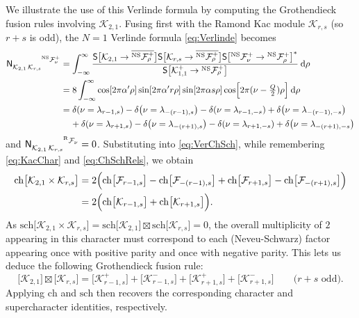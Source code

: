 \documentclass[a4paper,reqno,12pt]{report}
\theoremstyle{definition}
\numberwithin{equation}{section}
\let\originalleft\left     %
\let\originalright\right
\renewcommand{\left}{\mathopen{}\mathclose\bgroup\originalleft}
\renewcommand{\right}{\aftergroup\egroup\originalright}
\newcommand{\func}[2]{#1 \left( #2 \right)} %
\newcommand{\sqbrac}[1]{\left[ #1 \right]}
\newcommand{\dd}{\mathrm{d}}   %
\newcommand{\ra}{\rightarrow}
\newcommand{\Kac}[1]{\mathcal{K}_{#1}}       %
\newcommand{\Fock}[1]{\mathcal{F}_{#1}}      %
\newcommand{\chmap}{\mathrm{ch}}
\newcommand{\schmap}{\mathrm{sch}}
\newcommand{\Gr}[1]{\bigl[ #1 \bigr]}            %
\newcommand{\ch}[1]{\chmap \Gr{#1}}              %
\newcommand{\sch}[1]{\schmap \Gr{#1}}              %
\newcommand{\modS}{\mathsf{S}} %
\newcommand{\Smat}[2]{\modS \bigl[ #1 \ra #2 \bigr]}  %
\newcommand{\fuse}{\mathbin{\times}}                                            %
\newcommand{\Grfuse}{\mathbin{\boxtimes}}                                       %
\newcommand{\fuscoeff}[3]{\mathsf{N}_{#1 \, #2}^{\hphantom{#1 \, #2} #3}}       %
\newcommand{\ns}{Neveu-Schwarz}
\theoremstyle{plain}
\newcommand{\NSFock}[1]{{}^{\text{NS}}\Fock{#1}}   %
\newcommand{\RFock}[1]{{}^{\text{R}}\Fock{#1}}     %
\begin{document}
We illustrate the use of this Verlinde formula by computing the Grothendieck fusion rules involving $\Kac{2,1}$.  Fusing first with the Ramond Kac module $\Kac{r,s}$ (so $r+s$ is odd), the $N=1$ Verlinde formula \eqref{eq:Verlinde} becomes
\begin{align}
\fuscoeff{\Kac{2,1}}{\Kac{r,s}}{\NSFock{\nu}^+} &= \int_{-\infty}^{\infty} \frac{\Smat{\Kac{2,1}}{\overline{\NSFock{\rho}^+}} \Smat{\Kac{r,s}}{\overline{\NSFock{\rho}^+}} \Smat{\NSFock{\nu}^+}{\NSFock{\rho}^+}^*}{\Smat{\Kac{1,1}^+}{\NSFock{\rho}^+}} \: \dd \rho \notag \\
&= 8 \int_{-\infty}^{\infty} \cos \sqbrac{2 \pi \alpha' \rho} \sin \sqbrac{2 \pi \alpha' r \rho} \sin \sqbrac{2 \pi \alpha s \rho} \cos \sqbrac{2 \pi (\nu - \tfrac{Q}{2}) \rho} \: \dd \rho \notag \\
&= \func{\delta}{\nu = \lambda_{r-1,s}} - \func{\delta}{\nu = \lambda_{-(r-1),s}} - \func{\delta}{\nu = \lambda_{r-1,-s}} + \func{\delta}{\nu = \lambda_{-(r-1),-s}} \notag \\
&\mspace{20mu} + \func{\delta}{\nu = \lambda_{r+1,s}} - \func{\delta}{\nu = \lambda_{-(r+1),s}} - \func{\delta}{\nu = \lambda_{r+1,-s}} + \func{\delta}{\nu = \lambda_{-(r+1),-s}}
\end{align}
and $\fuscoeff{\Kac{2,1}}{\Kac{r,s}}{\RFock{\nu}} = 0$.  Substituting into \eqref{eq:VerChSch}, while remembering \eqref{eq:KacChar} and \eqref{eq:ChSchRels}, we obtain
\begin{align}
\ch{\Kac{2,1} \fuse \Kac{r,s}} &= 2 \Bigl( \ch{\Fock{r-1,s}} - \ch{\Fock{-(r-1),s}} + \ch{\Fock{r+1,s}} - \ch{\Fock{-(r+1),s}} \Bigr) \notag \\
&= 2 \Bigl( \ch{\Kac{r-1,s}} + \ch{\Kac{r+1,s}} \Bigr).
\end{align}
As $\sch{\Kac{2,1} \fuse \Kac{r,s}} = \sch{\Kac{2,1}} \Grfuse \sch{\Kac{r,s}} = 0$, the overall multiplicity of $2$ appearing in this character must correspond to each (\ns{}) factor appearing once with positive parity and once with negative parity.  This lets us deduce the following Grothendieck fusion rule:
\begin{equation} \label{GrFR:K21xKrsR}
\Gr{\Kac{2,1}} \Grfuse \Gr{\Kac{r,s}} = \Gr{\Kac{r-1,s}^+} + \Gr{\Kac{r-1,s}^-} + \Gr{\Kac{r+1,s}^+} + \Gr{\Kac{r+1,s}^-} \qquad \text{(\(r+s\) odd).}
\end{equation}
Applying $\chmap$ and $\schmap$ then recovers the corresponding character and supercharacter identities, respectively.
\end{document}

